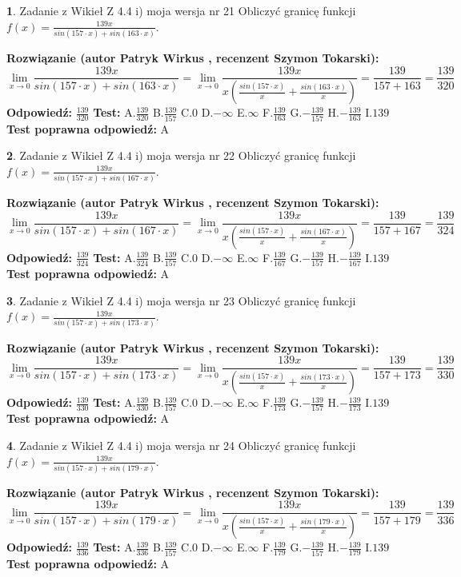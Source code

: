 \documentclass[12pt, a4paper]{article}
\theoremstyle{definition} %
\newtheorem{zad}{}
\newcommand{\zadStart}[1]{\begin{zad}#1\newline}
\newcommand{\zadStop}{\end{zad}}
\newcommand{\rozwStart}[2]{\noindent \textbf{Rozwiązanie (autor #1 , recenzent #2): }\newline}
\newcommand{\rozwStop}{\newline}
\newcommand{\odpStart}{\noindent \textbf{Odpowiedź:}\newline}
\newcommand{\odpStop}{\newline}
\newcommand{\testStart}{\noindent \textbf{Test:}\newline}
\newcommand{\testStop}{\newline}
\newcommand{\kluczStart}{\noindent \textbf{Test poprawna odpowiedź:}\newline}
\newcommand{\kluczStop}{\newline}
\begin{document}
\zadStart{Zadanie z Wikieł Z 4.4 i) moja wersja nr 21}
Obliczyć granicę funkcji $f(x)=\frac{139x}{sin(157\cdot x) +sin(163\cdot x)}$.
\zadStop
\rozwStart{Patryk Wirkus}{Szymon Tokarski}
$$\lim\limits_{x\to 0}\frac{139x}{sin(157\cdot x) +sin(163\cdot x)}=\lim\limits_{x\to 0}\frac{139x}{x(\frac{sin(157\cdot x)}{x}+\frac{sin(163\cdot x)}{x})}=\frac{139}{157+163} = \frac{139}{320}$$
\rozwStop
\odpStart
$\frac{139}{320}$
\odpStop
\testStart
A.$\frac{139}{320}$
B.$\frac{139}{157}$
C.$0$
D.$-\infty$
E.$\infty$
F.$\frac{139}{163}$
G.$-\frac{139}{157}$
H.$-\frac{139}{163}$
I.$139$
\testStop
\kluczStart
A
\kluczStop



\zadStart{Zadanie z Wikieł Z 4.4 i) moja wersja nr 22}
Obliczyć granicę funkcji $f(x)=\frac{139x}{sin(157\cdot x) +sin(167\cdot x)}$.
\zadStop
\rozwStart{Patryk Wirkus}{Szymon Tokarski}
$$\lim\limits_{x\to 0}\frac{139x}{sin(157\cdot x) +sin(167\cdot x)}=\lim\limits_{x\to 0}\frac{139x}{x(\frac{sin(157\cdot x)}{x}+\frac{sin(167\cdot x)}{x})}=\frac{139}{157+167} = \frac{139}{324}$$
\rozwStop
\odpStart
$\frac{139}{324}$
\odpStop
\testStart
A.$\frac{139}{324}$
B.$\frac{139}{157}$
C.$0$
D.$-\infty$
E.$\infty$
F.$\frac{139}{167}$
G.$-\frac{139}{157}$
H.$-\frac{139}{167}$
I.$139$
\testStop
\kluczStart
A
\kluczStop



\zadStart{Zadanie z Wikieł Z 4.4 i) moja wersja nr 23}
Obliczyć granicę funkcji $f(x)=\frac{139x}{sin(157\cdot x) +sin(173\cdot x)}$.
\zadStop
\rozwStart{Patryk Wirkus}{Szymon Tokarski}
$$\lim\limits_{x\to 0}\frac{139x}{sin(157\cdot x) +sin(173\cdot x)}=\lim\limits_{x\to 0}\frac{139x}{x(\frac{sin(157\cdot x)}{x}+\frac{sin(173\cdot x)}{x})}=\frac{139}{157+173} = \frac{139}{330}$$
\rozwStop
\odpStart
$\frac{139}{330}$
\odpStop
\testStart
A.$\frac{139}{330}$
B.$\frac{139}{157}$
C.$0$
D.$-\infty$
E.$\infty$
F.$\frac{139}{173}$
G.$-\frac{139}{157}$
H.$-\frac{139}{173}$
I.$139$
\testStop
\kluczStart
A
\kluczStop



\zadStart{Zadanie z Wikieł Z 4.4 i) moja wersja nr 24}
Obliczyć granicę funkcji $f(x)=\frac{139x}{sin(157\cdot x) +sin(179\cdot x)}$.
\zadStop
\rozwStart{Patryk Wirkus}{Szymon Tokarski}
$$\lim\limits_{x\to 0}\frac{139x}{sin(157\cdot x) +sin(179\cdot x)}=\lim\limits_{x\to 0}\frac{139x}{x(\frac{sin(157\cdot x)}{x}+\frac{sin(179\cdot x)}{x})}=\frac{139}{157+179} = \frac{139}{336}$$
\rozwStop
\odpStart
$\frac{139}{336}$
\odpStop
\testStart
A.$\frac{139}{336}$
B.$\frac{139}{157}$
C.$0$
D.$-\infty$
E.$\infty$
F.$\frac{139}{179}$
G.$-\frac{139}{157}$
H.$-\frac{139}{179}$
I.$139$
\testStop
\kluczStart
A
\kluczStop
\end{document}
